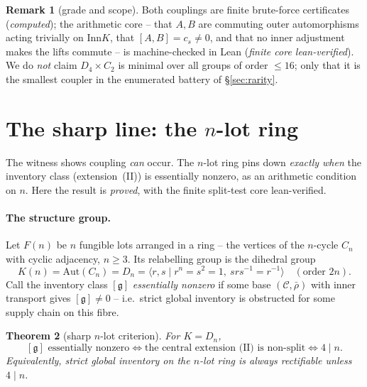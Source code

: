 \documentclass[11pt]{article}
\newtheorem{theorem}{Theorem}
\theoremstyle{definition}
\newtheorem{remark}[theorem]{Remark}
\newcommand{\C}{\mathcal{C}}
\newcommand{\Aut}{\mathrm{Aut}}
\newcommand{\Inn}{\mathrm{Inn}}
\newcommand{\gerbe}{\mathfrak{g}}
\newcommand{\gp}[1]{\langle #1\rangle}
\begin{document}
\begin{remark}[grade and scope]\label{rem:witness-grade}
Both couplings are finite brute-force certificates (\emph{computed}); the arithmetic core -- that
$A,B$ are commuting outer automorphisms acting trivially on $\Inn K$, that $[A,B]=c_s\neq0$, and
that no inner adjustment makes the lifts commute -- is machine-checked in Lean (\emph{finite core
lean-verified}). We do \emph{not} claim $D_4\times C_2$ is minimal over all groups of order $\le16$;
only that it is the smallest coupler in the enumerated battery of \S\ref{sec:rarity}.
\end{remark}

\section{The sharp line: the \texorpdfstring{$n$}{n}-lot ring}\label{sec:sharp}

The witness shows coupling \emph{can} occur. The $n$-lot ring pins down \emph{exactly when} the
inventory class (extension~(II)) is essentially nonzero, as an arithmetic condition on $n$. Here
the result is \emph{proved}, with the finite split-test core lean-verified.

\paragraph{The structure group.} Let $F(n)$ be $n$ fungible lots arranged in a ring -- the
vertices of the $n$-cycle $C_n$ with cyclic adjacency, $n\ge3$. Its relabelling group is the
dihedral group
\[
K(n)=\Aut(C_n)=D_n=\gp{r,s\mid r^n=s^2=1,\ srs^{-1}=r^{-1}}\quad(\text{order }2n).
\]
Call the inventory class $[\gerbe]$ \emph{essentially nonzero} if some base $(\C,\bar\rho)$ with
inner transport gives $[\gerbe]\neq0$ -- i.e.\ strict global inventory is obstructed for some
supply chain on this fibre.

\begin{theorem}[sharp $n$-lot criterion]\label{thm:sharp}
For $K=D_n$,
\[
[\gerbe]\text{ essentially nonzero}\iff\text{the central extension~(II) is non-split}\iff 4\mid n.
\]
Equivalently, strict global inventory on the $n$-lot ring is always rectifiable unless $4\mid n$.
\end{theorem}
\end{document}
